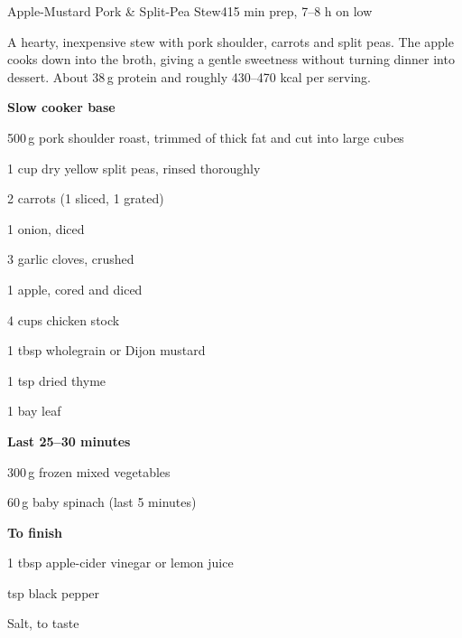 

\begin{recipebox}{Apple-Mustard Pork \& Split-Pea Stew}{4}{15 min prep, 7--8 h on low}

A hearty, inexpensive stew with pork shoulder, carrots and split peas. The apple
cooks down into the broth, giving a gentle sweetness without turning dinner into
dessert. About 38\,g protein and roughly 430--470 kcal per serving.

\begin{ingredients}
  \item[] \textbf{Slow cooker base}
  \item 500\,g pork shoulder roast, trimmed of thick fat and cut into large cubes
  \item 1 cup dry yellow split peas, rinsed thoroughly
  \item 2 carrots (1 sliced, 1 grated)
  \item 1 onion, diced
  \item 3 garlic cloves, crushed
  \item 1 apple, cored and diced
  \item 4 cups chicken stock
  \item 1 tbsp wholegrain or Dijon mustard
  \item 1 tsp dried thyme
  \item 1 bay leaf
  \item[] \textbf{Last 25--30 minutes}
  \item 300\,g frozen mixed vegetables
  \item 60\,g baby spinach (last 5 minutes)
  \item[] \textbf{To finish}
  \item 1 tbsp apple-cider vinegar or lemon juice
  \item {} tsp black pepper
  \item Salt, to taste
\end{ingredients}


\end{recipebox}
